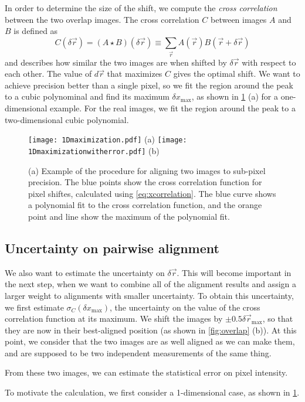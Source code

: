 \documentclass{article}
\begin{document}
In order to determine the size of the shift, we compute the \emph{cross correlation} between the two overlap images.  The cross correlation $C$ between images $A$ and $B$ is defined as
\begin{equation}
C(\delta\vec{r})=(A\star B)(\delta\vec{r})\equiv\sum_{\vec{r}} {A(\vec{r})B(\vec{r}+\delta\vec{r})}
\label{eq:xcorrelation}
\end{equation}
and describes how similar the two images are when shifted by $\delta\vec{r}$ with respect to each other.  The value of $d\vec{r}$ that maximizes $C$ gives the optimal shift.  We want to achieve precision better than a single pixel, so we fit the region around the peak to a cubic polynominal and find its maximum $\delta x_\text{max}$, as shown in \cref{fig:1Dmaximization} (a) for a one-dimensional example.  For the real images, we fit the region around the peak to a two-dimensional cubic polynomial.

\begin{figure}[ht]
	\centering
	\begin{multicols}{2}
	\texttt{[image: 1Dmaximization.pdf]} (a)
	\texttt{[image: 1Dmaximizationwitherror.pdf]} (b)
	\end{multicols}
	\caption{(a) Example of the procedure for aligning two images to sub-pixel precision.  The blue points show the cross correlation function for pixel shiftes, calculated using \cref{eq:xcorrelation}.  The blue curve shows a polynomial fit to the cross correlation function, and the orange point and line show the maximum of the polynomial fit.}
	\label{fig:1Dmaximization}
\end{figure}

\subsection{Uncertainty on pairwise alignment}

We also want to estimate the uncertainty on $\delta\vec{r}$.  This will become important in the next step, when we want to combine all of the alignment results and assign a larger weight to alignments with smaller uncertainty.  To obtain this uncertainty, we first estimate $\sigma_C(\delta x_\text{max})$, the uncertainty on the value of the cross correlation function at its maximum.  We shift the images by $\pm0.5\delta\vec{r}_\text{max}$, so that they are now in their best-aligned position (as shown in \cref{fig:overlap} (b)).  At this point, we consider that the two images are as well aligned as we can make them, and are supposed to be two independent measurements of the same thing.

From these two images, we can estimate the statistical error on pixel intensity.  

To motivate the calculation, we first consider a 1-dimensional case, as shown in \cref{fig:1Dmaximization}.
\end{document}
